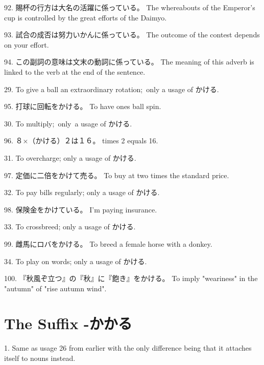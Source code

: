 \par{92. 賜杯の行方は大名の活躍に係っている。 \hfill\break
The whereabouts of the Emperor's cup is controlled by the great efforts of the Daimyo. }

\par{93. 試合の成否は努力いかんに係っている。 \hfill\break
The outcome of the contest depends on your effort. }

\par{94. この副詞の意味は文末の動詞に係っている。 \hfill\break
The meaning of this adverb is linked to the verb at the end of the sentence. }

\par{29. To give a ball an extraordinary rotation; only a usage of かける. }

\par{95. 打球に回転をかける。 \hfill\break
To have one\textquotesingle s ball spin. }

\par{30. To multiply; only a usage of かける. }

\par{96. ８×（かける）２は１６。 \hfill{} times 2 equals 16. }

\par{31. To overcharge; only a usage of かける. }

\par{97. 定価に二倍をかけて売る。 \hfill\break
To buy at two times the standard price. }

\par{32. To pay bills regularly; only a usage of かける. }

\par{98. 保険金をかけている。 \hfill\break
I'm paying insurance. }

\par{33. To crossbreed; only a usage of かける. }

\par{99. 雌馬にロバをかける。 \hfill\break
To breed a female horse with a donkey. }

\par{34. To play on words; only a usage of かける. }

\par{100. 『秋風ぞ立つ』の『秋』に『飽き』をかける。 \hfill\break
To imply "weariness" in the "autumn" of "rise autumn wind". }
      
\section{The Suffix -かかる}
 1. Same as usage 26 from earlier with the only difference being that it attaches itself to nouns instead. \hfill\break

